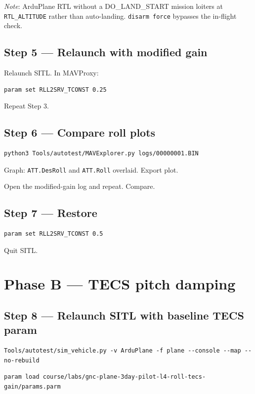 \documentclass[a4paper,11pt,twoside]{article}
\begin{document}
\textit{Note}: ArduPlane RTL without a DO\_LAND\_START mission loiters at \texttt{RTL\_ALTITUDE} rather than auto-landing. \texttt{disarm force} bypasses the in-flight check.

\subsection*{Step 5 --- Relaunch with modified gain}
Relaunch SITL. In MAVProxy:
\begin{Verbatim}[frame=single,fontsize=\small]
param set RLL2SRV_TCONST 0.25
\end{Verbatim}
Repeat Step 3.

\subsection*{Step 6 --- Compare roll plots}
\begin{Verbatim}[frame=single,fontsize=\small]
python3 Tools/autotest/MAVExplorer.py logs/00000001.BIN
\end{Verbatim}
Graph: \texttt{ATT.DesRoll} and \texttt{ATT.Roll} overlaid. Export plot.

Open the modified-gain log and repeat. Compare.

\subsection*{Step 7 --- Restore}
\begin{Verbatim}[frame=single,fontsize=\small]
param set RLL2SRV_TCONST 0.5
\end{Verbatim}
Quit SITL.

\section*{Phase B --- TECS pitch damping}

\subsection*{Step 8 --- Relaunch SITL with baseline TECS param}
\begin{Verbatim}[frame=single,fontsize=\small]
Tools/autotest/sim_vehicle.py -v ArduPlane -f plane --console --map --no-rebuild
\end{Verbatim}
\begin{Verbatim}[frame=single,fontsize=\small]
param load course/labs/gnc-plane-3day-pilot-l4-roll-tecs-gain/params.parm
\end{Verbatim}
\end{document}
